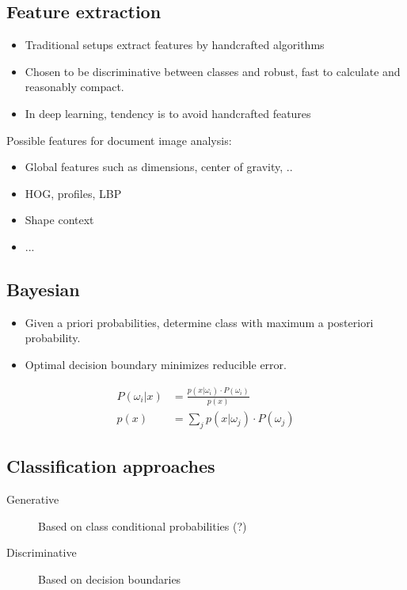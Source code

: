 \subsection{Feature extraction}

\begin{itemize}
		\item Traditional setups extract features by handcrafted algorithms
		\item Chosen to be discriminative between classes and robust, fast to
				calculate and reasonably compact.
		\item In deep learning, tendency is to avoid handcrafted features
\end{itemize}

Possible features for document image analysis:
\begin{itemize}
		\item Global features such as dimensions, center of gravity, ..
		\item HOG, profiles, LBP
		\item Shape context
		\item ...
\end{itemize}

\subsection{Bayesian}

\begin{itemize}
		\item Given a priori probabilities, determine class with maximum a
				posteriori probability.
		\item Optimal decision boundary minimizes reducible error.
\end{itemize}

\begin{align*}
		P(\omega_i | x) & = \frac{p(x | \omega_i) \cdot P(\omega_i)}{p(x)} \\
		p(x) & = \sum_j p(x | \omega_j) \cdot P(\omega_j)
\end{align*}

\subsection{Classification approaches}

\begin{description}
		\item[Generative] Based on class conditional probabilities (?)
		\item[Discriminative] Based on decision boundaries
\end{description}

